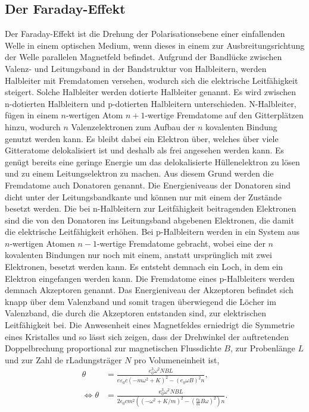 \subsection{Der Faraday-Effekt}
\label{subsec:Der Faraday-Effekt}

Der Faraday-Effekt ist die Drehung der Polarisationsebene einer einfallenden Welle in einem optischen Medium, wenn dieses in einem zur Ausbreitungsrichtung der Welle parallelen 
Magnetfeld befindet. Aufgrund der Bandlücke zwischen Valenz- und Leitungsband in der Bandstruktur von Halbleitern, werden Halbleiter mit Fremdatomen versehen, wodurch sich die
elektrische Leitfähigkeit steigert. Solche Halbleiter werden dotierte Halbleiter genannt. Es wird zwischen n-dotierten Halbleitern und p-dotierten Halbleitern unterschieden.
N-Halbleiter, fügen in einem $n$-wertigen Atom $n+1$-wertige Fremdatome auf den Gitterplätzen hinzu, wodurch $n$ Valenzelektronen zum Aufbau der
$n$ kovalenten Bindung genutzt werden kann. Es bleibt dabei ein Elektron über, welches über viele Gitteratome delokalisiert ist und deshalb als frei angesehen werden kann. Es genügt
bereits eine geringe Energie um das delokalisierte Hüllenelektron zu lösen und zu einem Leitungselektron zu machen. Aus diesem Grund werden die Fremdatome auch Donatoren genannt.
Die Energieniveaus der Donatoren sind dicht unter der Leitungsbandkante und können nur mit einem der Zustände besetzt werden. Die bei n-Halbleitern zur Leitfähigkeit beitragenden
Elektronen sind die von den Donatoren ins Leitungsband abgebenen Elektronen, die damit die elektrische Leitfähigkeit erhöhen.
Bei p-Halbleitern werden in ein System aus $n$-wertigen Atomen $n-1$-wertige Fremdatome gebracht, wobei eine der $n$ kovalenten Bindungen nur noch mit einem, anstatt ursprünglich mit
zwei Elektronen, besetzt werden kann. Es entsteht demnach ein Loch, in dem ein Elektron eingefangen werden kann. Die Fremdatome eines p-Halbleiters werden demnach Akzeptoren genannt.
Das Energieniveau der Akzeptoren befindet sich knapp über dem Valenzband und somit tragen überwiegend die Löcher im Valenzband, die durch die Akzeptoren entstanden sind, zur elektrischen
Leitfähigkeit bei.
Die Anwesenheit eines Magnetfeldes erniedrigt die Symmetrie eines Kristalles und so lässt sich zeigen, dass der Drehwinkel der auftretenden Doppelbrechung proportional zur
magnetischen Flussdichte $B$, zur Probenlänge $L$ und zur Zahl de rLadungsträger $N$ pro Volumeneinheit ist,
\begin{align}
    \theta&=\frac{e_0^3\omega^2NBL}{e\varepsilon_0c(-m\omega^2+K)^2-(e_0\omega B)^2n}, \\
    \iff \theta &=\frac{\text{e}_0^3\omega^2NBL}{2\epsilon_0cm^2\left(\left(-\omega^2+K/m\right)^2-\left(\frac{\text{e}_0}{m}B\omega\right)^2\right)n}.
    \label{eq:DrehwinkelDoppelbrechung}
\end{align}
